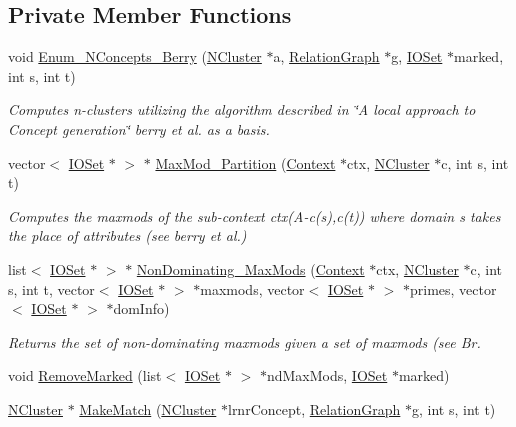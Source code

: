 \subsection*{Private Member Functions}
\begin{DoxyCompactItemize}
\item 
void \hyperlink{class_berry_lattice_algos_a0b2fefa9adf415442438b1bedbbfd317}{Enum\_\-NConcepts\_\-Berry} (\hyperlink{class_n_cluster}{NCluster} $\ast$a, \hyperlink{class_relation_graph}{RelationGraph} $\ast$g, \hyperlink{class_i_o_set}{IOSet} $\ast$marked, int s, int t)
\begin{DoxyCompactList}\small\item\em Computes n-\/clusters utilizing the algorithm described in \char`\"{}A local approach to Concept generation\char`\"{} berry et al. as a basis. \item\end{DoxyCompactList}\item 
vector$<$ \hyperlink{class_i_o_set}{IOSet} $\ast$ $>$ $\ast$ \hyperlink{class_berry_lattice_algos_a9aebe3a001353fc0b200f0c121def7fc}{MaxMod\_\-Partition} (\hyperlink{class_context}{Context} $\ast$ctx, \hyperlink{class_n_cluster}{NCluster} $\ast$c, int s, int t)
\begin{DoxyCompactList}\small\item\em Computes the maxmods of the sub-\/context ctx(A-\/c(s),c(t)) where domain s takes the place of attributes (see berry et al.) \item\end{DoxyCompactList}\item 
list$<$ \hyperlink{class_i_o_set}{IOSet} $\ast$ $>$ $\ast$ \hyperlink{class_berry_lattice_algos_a8edc5b3fcb0f597ccca4324fdee0deec}{NonDominating\_\-MaxMods} (\hyperlink{class_context}{Context} $\ast$ctx, \hyperlink{class_n_cluster}{NCluster} $\ast$c, int s, int t, vector$<$ \hyperlink{class_i_o_set}{IOSet} $\ast$ $>$ $\ast$maxmods, vector$<$ \hyperlink{class_i_o_set}{IOSet} $\ast$ $>$ $\ast$primes, vector$<$ \hyperlink{class_i_o_set}{IOSet} $\ast$ $>$ $\ast$domInfo)
\begin{DoxyCompactList}\small\item\em Returns the set of non-\/dominating maxmods given a set of maxmods (see Br. \item\end{DoxyCompactList}\item 
void \hyperlink{class_berry_lattice_algos_a4e77968caf06f4b29704062c6834a329}{RemoveMarked} (list$<$ \hyperlink{class_i_o_set}{IOSet} $\ast$ $>$ $\ast$ndMaxMods, \hyperlink{class_i_o_set}{IOSet} $\ast$marked)
\item 
\hyperlink{class_n_cluster}{NCluster} $\ast$ \hyperlink{class_berry_lattice_algos_a87c253892ac8350043390b5c373a25a0}{MakeMatch} (\hyperlink{class_n_cluster}{NCluster} $\ast$lrnrConcept, \hyperlink{class_relation_graph}{RelationGraph} $\ast$g, int s, int t)
\end{DoxyCompactItemize}


